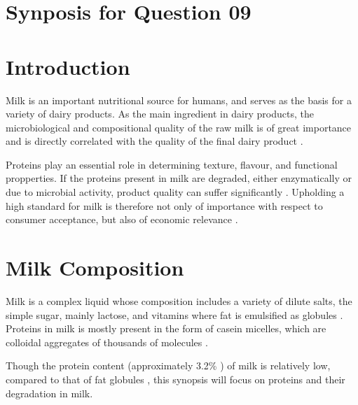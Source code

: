 \setcounter{chapter}{2}
\setcounter{section}{0}
\section*{Synposis for Question 09}

\section{Introduction}
Milk is an important nutritional source for humans, and serves as the basis for a variety of dairy products. As the main ingredient in dairy products, the microbiological and compositional quality of  the raw milk is of great importance and is directly correlated with the quality of the final dairy product \cite*{a01_protein_degradation_in_bovine_milk}. 

Proteins play an essential role in determining texture, flavour, and functional propperties. If the proteins present in milk are degraded, either enzymatically or due to microbial activity, product quality can suffer significantly \cite*{a02_proteases_and_protein_degradation}. Upholding a high standard for milk is therefore not only of importance with respect to consumer acceptance, but also of economic relevance \cite*{a01_protein_degradation_in_bovine_milk}.


\section{Milk Composition}
Milk is a complex liquid whose composition includes a variety of dilute salts, the simple sugar, mainly lactose, and vitamins where fat is emulsified as globules \cite*{a04_bovine_milk_in_human_nutrition}. Proteins in milk is mostly present in the form of casein micelles, which are colloidal aggregates of thousands of molecules \cite*{b01_milk_biochemistry}.

\vspace{0.5em}
Though the protein content (approximately 3.2\% \cite*{s09_milk_secretion_and_ejection}) of milk is relatively low, compared to that of fat globules \cite*{b01_milk_biochemistry}, this synopsis will focus on proteins and their degradation in milk.


